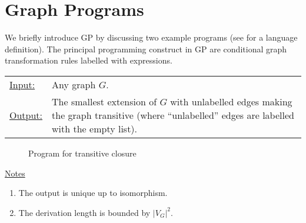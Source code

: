 \section{Graph Programs}
\label{sec:graph-programs}

We briefly introduce GP by discussing two example programs (see \cite{Plump12a} for a language definition). The principal programming construct in GP are conditional graph transformation rules labelled with expressions. 


\begin{example}

\begin{tabular}{lp{10.5cm}}
\ul{Input:} & Any graph $G$. \\
\ul{Output:} & The smallest extension of $G$ with unlabelled edges making the graph transitive (where ``unlabelled'' edges are labelled with the empty list).
\end{tabular}
  
\begin{figure}[htb]
\begin{center}
 
\end{center}
\caption{Program for transitive closure}\label{fig:transitive-closure}
\end{figure}

\ul{Notes}
\begin{enumerate}
\setlength{\itemsep}{-.5ex}
\item The output is unique up to isomorphism.
\item The derivation length is bounded by $|V_G|^2$.
\end{enumerate}
\end{example}


